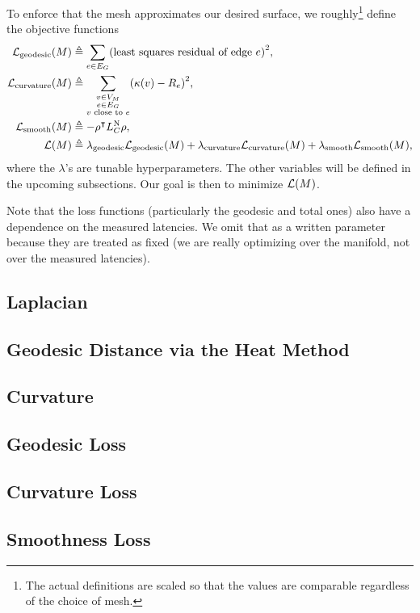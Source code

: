 \documentclass[10pt]{article}
\newcommand*\delimeter[3]{
	\ensuremath{\mathopen{}\left#2 #1\right#3\mathclose{}{\vphantom{\left#2 #1\right#3}}}
}
\newcommand*\pof[1]{\delimeter{#1}{(}{)}}
\begin{document}
	To enforce that the mesh approximates our desired surface, we roughly\footnote{The actual definitions are scaled so that the values are comparable regardless of the choice of mesh.} define the objective functions \begin{align*}
		\mathcal{L}_{\mathrm{geodesic}}\pof{M} &\triangleq \sum_{e \in E_G} \pof{\text{least squares residual of edge \(e\)}}^2, \\
		\mathcal{L}_{\mathrm{curvature}}\pof{M} &\triangleq \sum_{\substack{v \in V_M \\ e \in E_G \\ \text{\(v\) close to \(e\)}}} \pof{\kappa\pof{v} - R_e}^2, \\
		\mathcal{L}_{\mathrm{smooth}}\pof{M} &\triangleq -\rho^\intercal L_C^{\text{N}}\rho, \\
		\mathcal{L}\pof{M} &\triangleq \lambda_{\mathrm{geodesic}}\mathcal{L}_{\mathrm{geodesic}}\pof{M} + \lambda_{\mathrm{curvature}}\mathcal{L}_{\mathrm{curvature}}\pof{M} + \lambda_{\mathrm{smooth}}\mathcal{L}_{\mathrm{smooth}}\pof{M},
	\end{align*} where the \(\lambda\)'s are tunable hyperparameters. The other variables will be defined in the upcoming subsections. Our goal is then to minimize \(\mathcal{L}\pof{M}\).

	Note that the loss functions (particularly the geodesic and total ones) also have a dependence on the measured latencies. We omit that as a written parameter because they are treated as fixed (we are really optimizing over the manifold, not over the measured latencies).

	\subsection{Laplacian}
	

	\subsection{Geodesic Distance via the Heat Method}
	

	\subsection{Curvature}
	

	\subsection{Geodesic Loss}
	

	\subsection{Curvature Loss}
	

	\subsection{Smoothness Loss}
	
\end{document}
